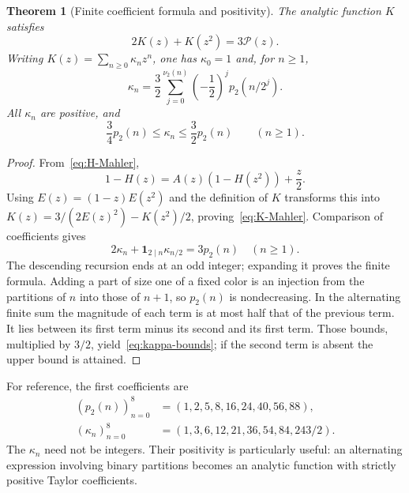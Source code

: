\documentclass[11pt,a4paper]{article}
\numberwithin{equation}{section}
\newtheorem{theorem}{Theorem}[section]
\theoremstyle{definition}
\theoremstyle{remark}
\newcommand{\vnu}{\nu_2}
\begin{document}
\begin{theorem}[Finite coefficient formula and positivity]
\label{thm:K-coeff}
The analytic function $K$ satisfies
\begin{equation}
 2K(z)+K(z^2)=3\mathcal P(z).
 \label{eq:K-Mahler}
\end{equation}
Writing $K(z)=\sum_{n\ge0}\kappa_nz^n$, one has $\kappa_0=1$ and, for $n\ge1$,
\begin{equation}
 \boxed{\quad
 \kappa_n=\frac32\sum_{j=0}^{\vnu(n)}
       \left(-\frac12\right)^j p_2(n/2^j).
 \quad}
 \label{eq:kappa-finite}
\end{equation}
All $\kappa_n$ are positive, and
\begin{equation}
 \frac34p_2(n)\le\kappa_n\le\frac32p_2(n)\qquad(n\ge1).
 \label{eq:kappa-bounds}
\end{equation}
\end{theorem}
\begin{proof}
From~\eqref{eq:H-Mahler},
\[
 1-H(z)=A(z)(1-H(z^2))+\frac z2.
\]
Using $E(z)=(1-z)E(z^2)$ and the definition of $K$ transforms this into
$K(z)=3/(2E(z)^2)-K(z^2)/2$, proving~\eqref{eq:K-Mahler}.
Comparison of coefficients gives
\[
 2\kappa_n+\mathbf1_{2\mid n}\kappa_{n/2}=3p_2(n)\quad(n\ge1).
\]
The descending recursion ends at an odd integer; expanding it proves the finite
formula. Adding a part of size one of a fixed color is an injection from the
partitions of $n$ into those of $n+1$, so $p_2(n)$ is nondecreasing. In the
alternating finite sum the magnitude of each term is at most half that of the
previous term. It lies between its first term minus its second and its first
term. Those bounds, multiplied by $3/2$, yield~\eqref{eq:kappa-bounds}; if the
second term is absent the upper bound is attained.
\end{proof}

For reference, the first coefficients are
\begin{align*}
 (p_2(n))_{n=0}^{8}&=(1,2,5,8,16,24,40,56,88),\\
 (\kappa_n)_{n=0}^{8}&=(1,3,6,12,21,36,54,84,243/2).
\end{align*}
The $\kappa_n$ need not be integers. Their positivity is particularly useful:
an alternating expression involving binary partitions becomes an analytic
function with strictly positive Taylor coefficients.
\end{document}
